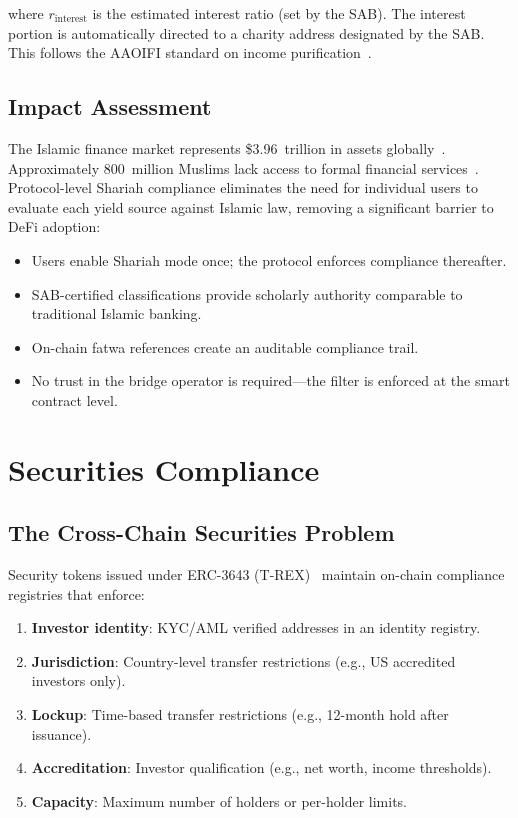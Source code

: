 \documentclass[11pt,twocolumn]{article}
\theoremstyle{definition}
\begin{document}
where $r_{\text{interest}}$ is the estimated interest ratio (set by the SAB). The interest portion is automatically directed to a charity address designated by the SAB. This follows the AAOIFI standard on income purification~\cite{aaoifi2015}.

\subsection{Impact Assessment}

The Islamic finance market represents \$3.96~trillion in assets globally~\cite{ifdi2024}. Approximately 800~million Muslims lack access to formal financial services~\cite{worldbank2022}. Protocol-level Shariah compliance eliminates the need for individual users to evaluate each yield source against Islamic law, removing a significant barrier to DeFi adoption:

\begin{itemize}[nosep]
  \item Users enable Shariah mode once; the protocol enforces compliance thereafter.
  \item SAB-certified classifications provide scholarly authority comparable to traditional Islamic banking.
  \item On-chain fatwa references create an auditable compliance trail.
  \item No trust in the bridge operator is required---the filter is enforced at the smart contract level.
\end{itemize}

\section{Securities Compliance}
\label{sec:securities}

\subsection{The Cross-Chain Securities Problem}

Security tokens issued under ERC-3643 (T-REX)~\cite{erc3643} maintain on-chain compliance registries that enforce:

\begin{enumerate}[nosep]
  \item \textbf{Investor identity}: KYC/AML verified addresses in an identity registry.
  \item \textbf{Jurisdiction}: Country-level transfer restrictions (e.g., US accredited investors only).
  \item \textbf{Lockup}: Time-based transfer restrictions (e.g., 12-month hold after issuance).
  \item \textbf{Accreditation}: Investor qualification (e.g., net worth, income thresholds).
  \item \textbf{Capacity}: Maximum number of holders or per-holder limits.
\end{enumerate}
\end{document}
